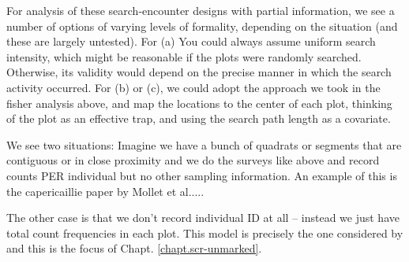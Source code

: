 For analysis of these search-encounter designs with partial information,
we see a number of options of varying levels of formality,
depending on the situation (and these are largely untested). 
For (a) You could always assume uniform search intensity,
which might be reasonable if the plots were randomly
searched. Otherwise, its validity would depend on the precise manner
in which the search activity occurred. 
For (b) or (c), we could adopt the approach we took in the fisher analysis
above, and  map the locations to the center of each plot, thinking of
the plot as an effective trap, and using the search path length
as a covariate.


We see two situations:
Imagine we have a bunch of quadrats or segments that are contiguous or
in close proximity
and we do the surveys like above and record counts PER individual  but
no other sampling information. An example of this is the capericaillie
paper by Mollet et al.....

The other case is that we don't record individual ID at all -- instead
we just have total count frequencies in each plot.
This model is precisely the one considered by
\citep{chandler_royle:2012} and this is the focus of
Chapt. \ref{chapt.scr-unmarked}.




